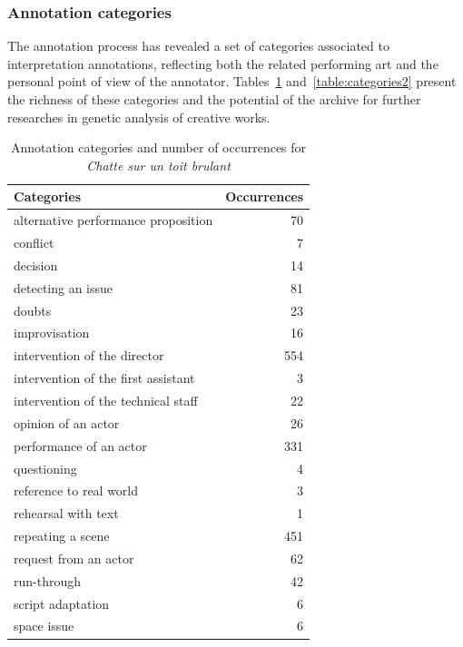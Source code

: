 \documentclass[conference]{IEEEtran}
\newcommand{\todo}[1]{\noindent\textcolor{red}{{\bf \{ToDo} #1{\bf \}}}}
\begin{document}
\subsubsection{Annotation categories}

The annotation process has revealed a set of categories associated to interpretation annotations, reflecting both the related performing art and the personal point of view of the annotator. Tables~\ref{table:categories1} and~\ref{table:categories2} present the richness of these categories and the potential of the archive for further researches in genetic analysis of creative works.

\begin{table}
\centering
\small
\begin{tabular}{|p{6cm}|r|}
\hline 
Categories & Occurrences \\ 
\hline 
alternative performance proposition & 70 \\ 
\hline 
conflict & 7 \\ 
decision & 14 \\ 
\hline 
detecting an issue & 81 \\ 
\hline 
doubts & 23 \\ 
\hline 
improvisation & 16 \\ 
\hline 
intervention of the director & 554 \\ 
\hline 
intervention of the first assistant & 3 \\ 
\hline 
intervention of the technical staff & 22 \\ 
\hline 
opinion of an actor & 26 \\ 
\hline 
performance of an actor & 331 \\ 
\hline 
questioning & 4 \\ 
\hline 
reference to real world & 3 \\ 
\hline 
rehearsal with text & 1 \\ 
\hline 
repeating a scene & 451 \\ 
\hline 
request from an actor & 62 \\ 
\hline 
run-through & 42 \\ 
\hline 
script adaptation & 6 \\ 
\hline 
space issue & 6 \\ 
\hline 
\end{tabular}
\label{table:categories1}
\caption{Annotation categories and number of occurrences for \emph{Chatte sur un toit brulant}}
\end{table}
\end{document}
